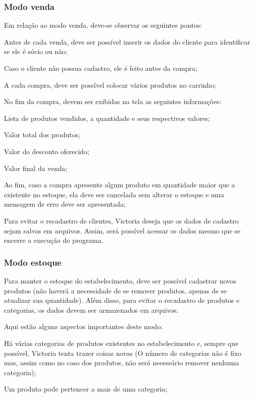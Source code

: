 \subsubsection*{Modo venda}

Em relação ao modo venda, deve-\/se observar os seguintes pontos\+:
\begin{DoxyItemize}
\item Antes de cada venda, deve ser possível inserir os dados do cliente para identificar se ele é sócio ou não;
\item Caso o cliente não possua cadastro, ele é feito antes da compra;
\item A cada compra, deve ser possível colocar vários produtos no carrinho;
\item No fim da compra, devem ser exibidas na tela as seguintes informações\+:
\begin{DoxyItemize}
\item Lista de produtos vendidos, a quantidade e seus respectivos valores;
\item Valor total dos produtos;
\item Valor do desconto oferecido;
\item Valor final da venda;
\end{DoxyItemize}
\item Ao fim, caso a compra apresente algum produto em quantidade maior que a existente no estoque, ela deve ser cancelada sem alterar o estoque e uma mensagem de erro deve ser apresentada;
\end{DoxyItemize}

Para evitar o recadastro de clientes, Victoria deseja que os dados de cadastro sejam salvos em arquivos. Assim, será possível acessar os dados mesmo que se encerre a execução do programa.

\subsubsection*{Modo estoque}

Para manter o estoque do estabelecimento, deve ser possível cadastrar novos produtos (não haverá a necessidade de se remover produtos, apenas de se atualizar sua quantidade). Além disso, para evitar o recadastro de produtos e categorias, os dados devem ser armazenados em arquivos.

Aqui estão alguns aspectos importantes deste modo\+:
\begin{DoxyItemize}
\item Há várias categorias de produtos existentes no estabelecimento e, sempre que possível, Victoria tenta trazer coisas novas (O número de categorias não é fixo mas, assim como no caso dos produtos, não será necessário remover nenhuma categoria);
\item Um produto pode pertencer a mais de uma categoria;
\end{DoxyItemize}

